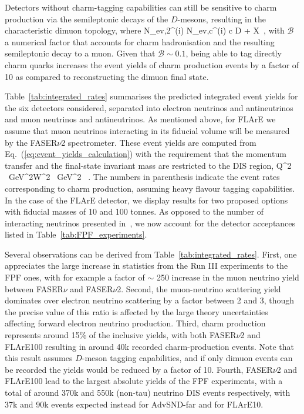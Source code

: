   Detectors without charm-tagging capabilities can still be sensitive to charm production via
  the semileptonic decays of the $D$-mesons, resulting in the characteristic
  dimuon topology, where
  \be
 N_{\rm ev,2\mu}^{(i)} \approx N_{\rm ev,c}^{(i)} \times {}\lp c \to D \to \mu + X\rp \, ,
 \ee
 with $\mathcal{B}$ a numerical factor that accounts for charm hadronisation and the
 resulting semileptonic decay to a muon.
 Given that $\mathcal{B}\sim 0.1$, being able to tag directly charm quarks increases the event yields
 of charm production events by a factor of 10 as compared to reconstructing the dimuon final state.

 Table~\ref{tab:integrated_rates} summarises the predicted integrated event yields for the six
 detectors
considered, separated into electron neutrinos and antineutrinos
and muon neutrinos and antineutrinos.
%
As mentioned above, for FLArE we assume that muon neutrinos interacting
in its fiducial volume will be measured
by the FASER$\nu$2 spectrometer.
These event yields are computed from Eq.~(\ref{eq:event_yields_calculation}) with the
requirement that the momentum transfer and the final-state invariant mass are restricted
to the DIS region,
\be
\label{eq:DISconditions}
Q^2 ~{\rm GeV}^2\quad  W^2 ~{\rm GeV}^2 \, .
\ee
%
The numbers in parenthesis indicate the event rates corresponding to charm
production, assuming heavy flavour tagging capabilities.
%
In the case of the FLArE detector, we display results for two proposed options with fiducial
masses of 10 and 100 tonnes.
%
As opposed to the number of interacting neutrinos presented
in~\cite{Feng:2022inv}, we now account for the
detector acceptances listed in  Table~\ref{tab:FPF_experiments}. 






Several observations can be derived from Table~\ref{tab:integrated_rates}.
%
First, one appreciates the large increase in statistics from
the Run III experiments to the FPF ones, with for example a factor of
$\sim$ 250 increase in the muon neutrino yield between FASER$\nu$ and
FASER$\nu$2.
%
Second, the muon-neutrino scattering yield dominates over electron neutrino scattering by a factor
between 2 and 3, though the precise value of this ratio is affected by the large theory uncertainties
affecting forward electron neutrino production.
%
Third, charm production  represents around 15\% of the inclusive
yields, with both FASER$\nu$2 and FLArE100 resulting in around
40k recorded charm-production events.
%
Note that this result assumes $D$-meson tagging capabilities,
and if only dimuon events can be recorded
the yields would be reduced by a factor of 10.
%
Fourth, FASER$\nu$2 and FLArE100 lead to the largest absolute
yields of the FPF experiments, with a total of around 370k and 550k (non-tau) neutrino DIS events respectively, with 37k and 90k
events expected instead for AdvSND-far and for FLArE10.

